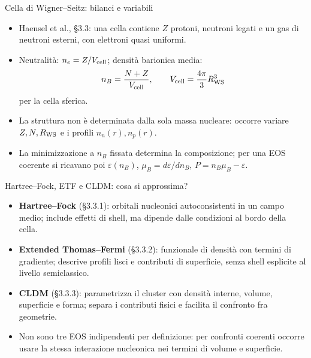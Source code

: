 \begin{frame}[t]{Cella di Wigner--Seitz: bilanci e variabili}
\small
\begin{itemize}
\item Haensel et al., \S3.3: una cella contiene \(Z\) protoni, neutroni legati e un gas di neutroni esterni, con elettroni quasi uniformi.
\item Neutralità: \(n_e=Z/V_{\rm cell}\); densità barionica media:
\[
n_B=\frac{N+Z}{V_{\rm cell}},\qquad V_{\rm cell}=\frac{4\pi}{3}R_{\rm WS}^3
\]
per la cella sferica.
\item La struttura non è determinata dalla sola massa nucleare: occorre variare \(Z,N,R_{\rm WS}\) e i profili \(n_n(r),n_p(r)\).
\item La minimizzazione a \(n_B\) fissata determina la composizione; per una EOS coerente si ricavano poi \(\varepsilon(n_B)\), \(\mu_B=d\varepsilon/dn_B\), \(P=n_B\mu_B-\varepsilon\).
\end{itemize}
\end{frame}

\begin{frame}[t]{Hartree--Fock, ETF e CLDM: cosa si approssima?}
\small
\begin{itemize}
\item \textbf{Hartree--Fock} (\S3.3.1): orbitali nucleonici autoconsistenti in un campo medio; include effetti di shell, ma dipende dalle condizioni al bordo della cella.
\item \textbf{Extended Thomas--Fermi} (\S3.3.2): funzionale di densità con termini di gradiente; descrive profili lisci e contributi di superficie, senza shell esplicite al livello semiclassico.
\item \textbf{CLDM} (\S3.3.3): parametrizza il cluster con densità interne, volume, superficie e forma; separa i contributi fisici e facilita il confronto fra geometrie.
\item Non sono tre EOS indipendenti per definizione: per confronti coerenti occorre usare la stessa interazione nucleonica nei termini di volume e superficie.
\end{itemize}
\end{frame}

